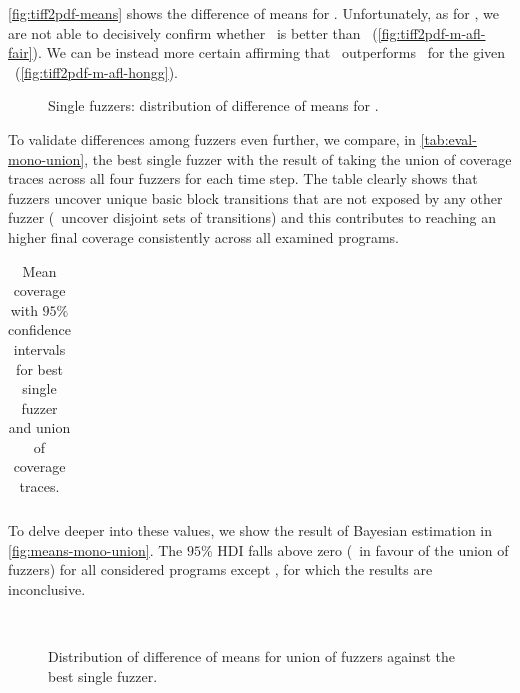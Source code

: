 \autoref{fig:tiff2pdf-means} shows the difference of means for \tiffpdf.
Unfortunately, as for \djpeg, we are not able to decisively confirm whether
\aflfast\ is better than \fairfuzz\ (\autoref{fig:tiff2pdf-m-afl-fair}). We can
be instead more certain affirming that \aflfast\ outperforms \honggfuzz\ for the
given \sut\ (\autoref{fig:tiff2pdf-m-afl-hongg}).

\begin{figure}[h]
    \centering%
    \caption{Single fuzzers: distribution of difference of means for \tiffpdf.}
    \label{fig:tiff2pdf-means}
\end{figure}

To validate differences among fuzzers even further, we compare, in
\autoref{tab:eval-mono-union}, the best single fuzzer with the result of taking
the union of coverage traces across all four fuzzers for each time step. The
table clearly shows that fuzzers uncover unique basic block transitions that are
not exposed by any other fuzzer (\ie~uncover disjoint sets of transitions) and
this contributes to reaching an higher final coverage consistently across all
examined programs.

\begin{table}[h]
    \centering%
    \begin{tabular}{l c l c}
        
    \end{tabular}
    \caption{Mean coverage with $95\%$ confidence intervals for best single
    fuzzer and union of coverage traces.}
    \label{tab:eval-mono-union}
\end{table}

To delve deeper into these values, we show the result of Bayesian estimation in
\autoref{fig:means-mono-union}. The $95\%$ \ac{HDI} falls above zero (\ie~in
favour of the union of fuzzers) for all considered programs except \djpeg, for
which the results are inconclusive.

\begin{figure}[h]
    \centering%
    \\
    \caption{Distribution of difference of means for union of fuzzers against
    the best single fuzzer.}
    \label{fig:means-mono-union}
\end{figure}

